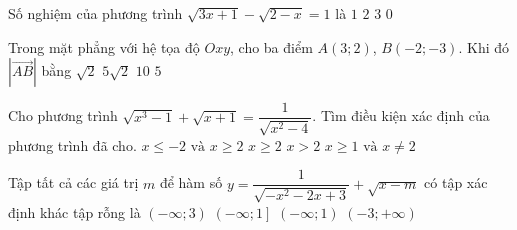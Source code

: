 \begin{ex}%
	Số nghiệm của phương trình $\sqrt{3x+1}-\sqrt{2-x}=1$ là
	\choice
	{\True $1$}
	{$2$}
	{$3$}
	{$0$}
\end{ex}

\begin{ex}%
	Trong mặt phẳng với hệ tọa độ $Oxy$, cho ba điểm $A(3;2)$, $B(-2;-3)$. Khi đó $|\vec{AB}|$ bằng
	\choice
	{$\sqrt{2}$}
	{\True$5\sqrt{2}$}
	{$10$}
	{$5$}	
\end{ex}
\begin{ex}%
	Cho phương trình $\sqrt{x^3-1}+\sqrt{x+1}=\dfrac{1}{\sqrt{x^2-4}}$. Tìm điều kiện xác định của phương trình đã cho.
	\choice
	{$x \le -2 \text{ và } x \ge 2$}
	{$x \geq 2$}
	{\True $x > 2 $}
	{$x \ge 1 \text{ và } x \ne 2$}
\end{ex}

\begin{ex}%
	Tập tất cả các giá trị $m$ để hàm số $y=\dfrac{1}{\sqrt{-x^2-2x+3}}+\sqrt{x-m}$ có tập xác định khác tập rỗng là
	\choice
	{$\left(-\infty; 3\right)$}
	{$\left(-\infty; 1\right]$}
	{\True $\left(- \infty; 1\right)$}
	{$\left(-3; +\infty\right)$}
\end{ex}

